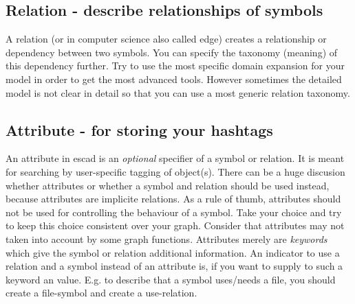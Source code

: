 \documentclass[a4paper, 12pt, openany]{scrbook}
\begin{document}
\subsection{Relation - describe relationships of symbols}
A relation (or in computer science also called edge) creates a relationship or dependency between two symbols. You can specify the taxonomy (meaning) of this dependency further. Try to use the most specific domain expansion for your model in order to get the most advanced tools. However sometimes the detailed model is not clear in detail so that you can use a most generic relation taxonomy.
\subsection{Attribute - for storing your hashtags}
An attribute in escad is an \emph{optional} specifier of a symbol or relation. It is meant for searching by user-specific tagging of object(s). There can be a huge discusion whether attributes or whether a symbol and relation should be used instead, because attributes are implicite relations. As a rule of thumb, attributes should not be used for controlling the behaviour of a symbol. Take your choice and try to keep this choice consistent over your graph. Consider that attributes may not taken into account by some graph functions. Attributes merely are \emph{keywords} which give the symbol or relation additional information. An indicator to use a relation and a symbol instead of an attribute is, if you want to supply to such a keyword an value. E.g. to describe that a symbol uses/needs a file, you should create a file-symbol and create a use-relation.
\end{document}
